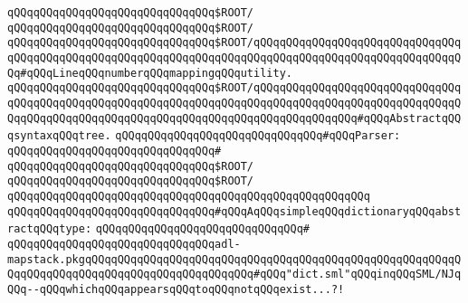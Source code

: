 \verb|qQQqqQQqqQQqqQQqqQQqqQQqqQQqqQQq$ROOT/|\newline
\verb|qQQqqQQqqQQqqQQqqQQqqQQqqQQqqQQq$ROOT/|\newline
\newline
\verb|qQQqqQQqqQQqqQQqqQQqqQQqqQQqqQQq$ROOT/|\verb|qQQqqQQqqQQqqQQqqQQqqQQqqQQqqQQqqQQqqQQqqQQqqQQqqQQqqQQqqQQqqQQqqQQqqQQqqQQqqQQqqQQqqQQqqQQqqQQqqQQqqQQq#qQQqLineqQQqnumberqQQqmappingqQQqutility.|\newline
\verb|qQQqqQQqqQQqqQQqqQQqqQQqqQQqqQQq$ROOT/|\verb|qQQqqQQqqQQqqQQqqQQqqQQqqQQqqQQqqQQqqQQqqQQqqQQqqQQqqQQqqQQqqQQqqQQqqQQqqQQqqQQqqQQqqQQqqQQqqQQqqQQqqQQqqQQqqQQqqQQqqQQqqQQqqQQqqQQqqQQqqQQqqQQqqQQqqQQqqQQq#qQQqAbstractqQQqsyntaxqQQqtree.|\newline
\newline
\verb|qQQqqQQqqQQqqQQqqQQqqQQqqQQqqQQq#qQQqParser:|\newline
\verb|qQQqqQQqqQQqqQQqqQQqqQQqqQQqqQQq#|\newline
\verb|qQQqqQQqqQQqqQQqqQQqqQQqqQQqqQQq$ROOT/|\newline
\verb|qQQqqQQqqQQqqQQqqQQqqQQqqQQqqQQq$ROOT/|\newline
\verb|qQQqqQQqqQQqqQQqqQQqqQQqqQQqqQQqqQQqqQQqqQQqqQQqqQQqqQQq|\newline
\newline
\verb|qQQqqQQqqQQqqQQqqQQqqQQqqQQqqQQq#qQQqAqQQqsimpleqQQqdictionaryqQQqabstractqQQqtype:|\newline
\verb|qQQqqQQqqQQqqQQqqQQqqQQqqQQqqQQq#|\newline
\verb|qQQqqQQqqQQqqQQqqQQqqQQqqQQqqQQqadl-mapstack.pkgqQQqqQQqqQQqqQQqqQQqqQQqqQQqqQQqqQQqqQQqqQQqqQQqqQQqqQQqqQQqqQQqqQQqqQQqqQQqqQQqqQQqqQQqqQQqqQQq#qQQq"dict.sml"qQQqinqQQqSML/NJqQQq--qQQqwhichqQQqappearsqQQqtoqQQqnotqQQqexist...?!|\newline
\newline
